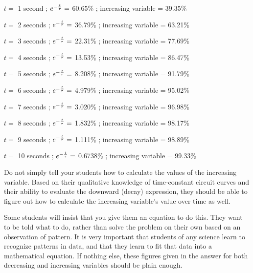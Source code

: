 \medskip
\item{} $t =$ 1 second ; $e^{-{t \over \tau}} =$ 60.65\% ; increasing variable = 39.35\%
\item{} $t =$ 2 seconds ; $e^{-{t \over \tau}} =$ 36.79\% ; increasing variable = 63.21\%
\item{} $t =$ 3 seconds ; $e^{-{t \over \tau}} =$ 22.31\% ; increasing variable = 77.69\%
\item{} $t =$ 4 seconds ; $e^{-{t \over \tau}} =$ 13.53\% ; increasing variable = 86.47\%
\item{} $t =$ 5 seconds ; $e^{-{t \over \tau}} =$ 8.208\% ; increasing variable = 91.79\%
\item{} $t =$ 6 seconds ; $e^{-{t \over \tau}} =$ 4.979\% ; increasing variable = 95.02\%
\item{} $t =$ 7 seconds ; $e^{-{t \over \tau}} =$ 3.020\% ; increasing variable = 96.98\%
\item{} $t =$ 8 seconds ; $e^{-{t \over \tau}} =$ 1.832\% ; increasing variable = 98.17\%
\item{} $t =$ 9 seconds ; $e^{-{t \over \tau}} =$ 1.111\% ; increasing variable = 98.89\%
\item{} $t =$ 10 seconds ; $e^{-{t \over \tau}} =$ 0.6738\% ; increasing variable = 99.33\%
\medskip







Do not simply tell your students how to calculate the values of the increasing variable.  Based on their qualitative knowledge of time-constant circuit curves and their ability to evaluate the downward (decay) expression, they should be able to figure out how to calculate the increasing variable's value over time as well.

Some students will insist that you give them an equation to do this.  They want to be told what to do, rather than solve the problem on their own based on an observation of pattern.  It is very important that students of any science learn to recognize patterns in data, and that they learn to fit that data into a mathematical equation.  If nothing else, these figures given in the answer for both decreasing and increasing variables should be plain enough.




